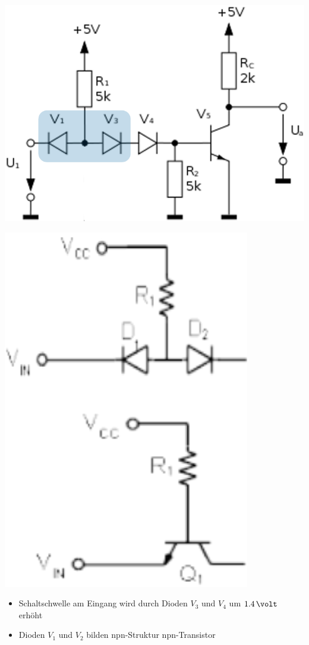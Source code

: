 \begin{minipage}[c]{0.3\columnwidth}
    \includegraphics[width=\columnwidth]{images/dtl_zu_ttl.png}
\end{minipage}
\hfill
\begin{minipage}[c]{0.15\columnwidth}
    \includegraphics[width=\columnwidth]{images/dtl_zu_ttl_transistors.png}
\end{minipage}
\hfill
\begin{minipage}[c]{0.48\columnwidth}
    \begin{itemize}
        \item  Schaltschwelle am Eingang wird durch Dioden $V_3$ und $V_4$ um $1.4 \, \volt$ erhöht
        \item Dioden $V_1$ und $V_2$ bilden npn-Struktur \textrightarrow npn-Transistor
    \end{itemize}
\end{minipage}

